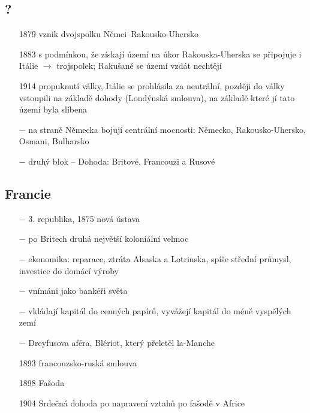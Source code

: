 \documentclass{article}
\begin{document}
\subsection*{?}
\begin{itemize}
    \vspace{-0.5em}
    \setlength\itemsep{0.15em}
    \item[1879] vznik dvojspolku Němci--Rakousko-Uhersko
    \item[1883] s podmínkou, že získají území na úkor Rakouska-Uherska se připojuje i Itálie $\rightarrow$ trojspolek; Rakušané se území vzdát nechtějí
    \item[1914] propuknutí války, Itálie se prohlásila za neutrální, později do války vstoupili na základě dohody (Londýnská smlouva), na základě které jí tato území byla slíbena
    \item[$-$] na straně Německa bojují centrální mocnosti: Německo, Rakousko-Uhersko, Osmani, Bulharsko
    \item[$-$] druhý blok -- Dohoda: Britové, Francouzi a Rusové
\end{itemize}

\subsection*{Francie}
\begin{itemize}
    \vspace{-0.5em}
    \setlength\itemsep{0.15em}
    \item[$-$] 3. republika, 1875 nová ústava
    \item[$-$] po Britech druhá největší koloniální velmoc
    \item[$-$] ekonomika: reparace, ztráta Alsaska a Lotrinska, spíše střední průmysl, investice do domácí výroby
    \item[$-$] vnímáni jako bankéři světa
    \item[$-$] vkládají kapitál do cenných papírů, vyvážejí kapitál do méně vyspělých zemí
    \item[$-$] Dreyfusova aféra, Blériot, který přeletěl la-Manche
    \item[1893] francouzsko-ruská smlouva
    \item[1898] Fašoda
    \item[1904] Srdečná dohoda po napravení vztahů po fašodě v Africe
\end{itemize}
\end{document}
